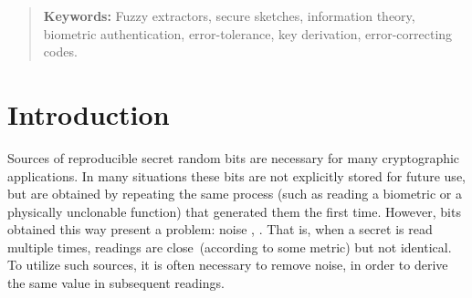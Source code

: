 \documentclass[11pt]{article}
\begin{document}
\begin{abstract}
  



\medskip
\textbf{Keywords:} Fuzzy extractors, secure sketches, information theory, biometric authentication, error-tolerance, key derivation, error-correcting codes.
\end{abstract}

\section{Introduction}
Sources of reproducible secret random bits are necessary for many cryptographic applications.  In many situations these bits are not explicitly stored for future use, but are obtained by repeating the same process  (such as reading a biometric or a physically unclonable function) that generated them the first time.
However, bits obtained this way present a problem: noise \cite{daugman2004,zviran1993comparison,brostoff2000passfaces,ellison2000protecting,mayrhofer2009shake}, \cite{monrose2002password,pappu2002physical,gassend2002silicon,tuyls2006puf,suh2007physical,bennett1988privacy}.  That is, when a secret is read multiple times, readings are close~(according to some metric) but not identical.  To utilize such sources, it is often necessary to remove noise, in order to derive the same value in subsequent readings.
\end{document}
